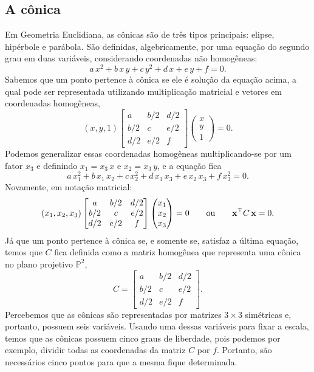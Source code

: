 \subsection{A cônica}\label{sec.definicao-conica}


Em Geometria Euclidiana, as cônicas são de três tipos principais: elipse, hipérbole e parábola. São definidas, algebricamente, por uma equação do segundo grau em duas variáveis, considerando coordenadas não homogêneas:
\begin{equation*}
a\,x^2+b\,x\,y+c\,y^2+d\,x+e\,y+f=0.
\end{equation*}
Sabemos que um ponto pertence à cônica se ele é solução da equação acima, a qual pode ser representada utilizando multiplicação matricial e vetores em coordenadas homogêneas,
\begin{equation*}
(x,y,1) 
 \begin{bmatrix}
a & b/2 & d/2\\
b/2 & c & e/2\\
d/2 & e/2 & f
\end{bmatrix}
 \begin{pmatrix}
x\\
y\\
1
\end{pmatrix}
 = 0.
\end{equation*}
Podemos generalizar essas coordenadas homogêneas multiplicando-se por um fator $x_3$ e definindo $x_1=x_3\,x$ e $x_2=x_3\,y$, e a equação fica
\begin{equation*}
a\,x_1^2+b\,x_1\,x_2+c\,x_2^2+d\,x_1\,x_3+e\,x_2\,x_3+f\,x_3^2=0.
\end{equation*}
Novamente, em notação matricial:
\begin{equation*}
(x_1,x_2,x_3) 
 \begin{bmatrix}
  a & b/2 & d/2\\
  b/2 & c & e/2\\
  d/2 & e/2 & f
  \end{bmatrix}
 \begin{pmatrix}
  x_1\\
  x_2\\
  x_3
  \end{pmatrix}
 = 0
 \qquad \text{ou} \qquad
 \mathbf{x}^\top C\,\mathbf{x} = 0.
\end{equation*}
Já que um ponto pertence à cônica se, e somente se, satisfaz a última equação, temos que $C$ fica definida como a matriz homogênea que representa uma cônica no plano projetivo $\mathbb{P}^2$,
\begin{equation*}
C =  \begin{bmatrix}
      a & b/2 & d/2\\
      b/2 & c & e/2\\
      d/2 & e/2 & f
      \end{bmatrix}.
\end{equation*}
Percebemos que as cônicas são representadas por matrizes $3\times3$ simétricas e, portanto, possuem seis variáveis. Usando uma dessas variáveis para fixar a escala, temos que as cônicas possuem cinco graus de liberdade, pois podemos por exemplo, dividir todas as coordenadas da matriz $C$ por $f$. Portanto, são necessários cinco pontos para que a mesma fique determinada.
